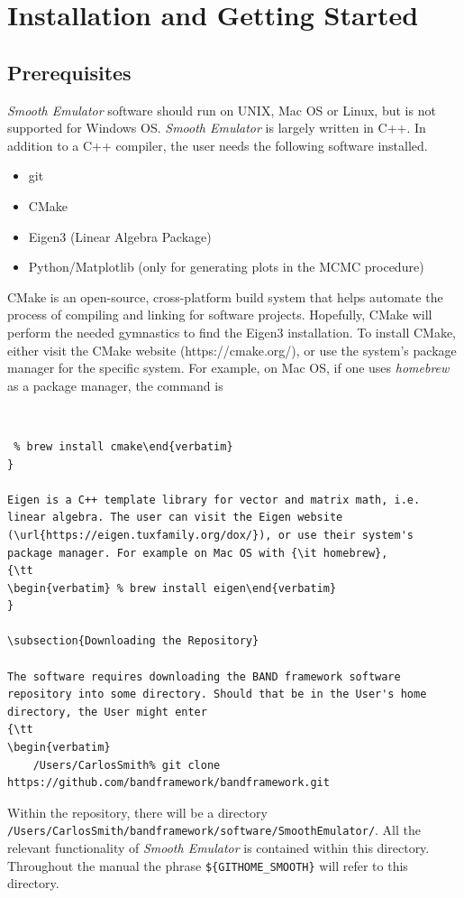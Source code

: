 \documentclass[UserManual.tex]{subfiles}
\begin{document}
\setcounter{section}{1}

\section{Installation and Getting Started}\label{sec:installation}

\subsection{Prerequisites}
{\it Smooth Emulator} software should run on UNIX, Mac OS or Linux, but is not supported for Windows OS. {\it Smooth Emulator} is largely  written in C++. In addition to a C++ compiler, the user needs the following software installed.

\begin{itemize}
    \item git
    \item CMake
    \item Eigen3 (Linear Algebra Package)
    \item Python/Matplotlib (only for generating plots in the MCMC procedure)
\end{itemize}

CMake is an open-source, cross-platform build system that helps automate the process of compiling and linking for software projects. Hopefully, CMake will perform the needed gymnastics to find the Eigen3 installation. To install CMake, either visit the CMake website (https://cmake.org/), or use the system's package manager for the specific system. For example, on Mac OS, if one uses {\it homebrew} as a package manager, the command is
{\tt 
\begin{verbatim} % brew install cmake\end{verbatim}
}

Eigen is a C++ template library for vector and matrix math, i.e. linear algebra. The user can visit the Eigen website (\url{https://eigen.tuxfamily.org/dox/}), or use their system's package manager. For example on Mac OS with {\it homebrew},
{\tt 
\begin{verbatim} % brew install eigen\end{verbatim}
}

\subsection{Downloading the Repository}

The software requires downloading the BAND framework software repository into some directory. Should that be in the User's home directory, the User might enter
{\tt 
\begin{verbatim}
    /Users/CarlosSmith% git clone https://github.com/bandframework/bandframework.git
\end{verbatim}
}
Within the repository, there will be a directory\\{\tt /Users/CarlosSmith/bandframework/software/SmoothEmulator/}. All the relevant functionality of {\it Smooth Emulator} is contained within this directory. Throughout the manual the phrase {\tt \$\{GITHOME\_SMOOTH\}} will refer to this directory. 
\end{document}
